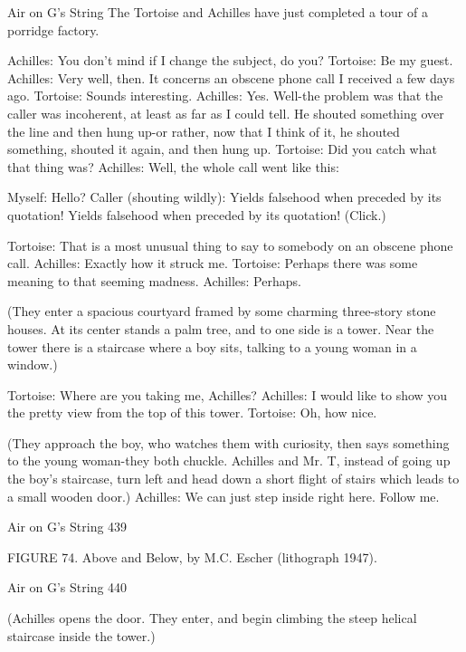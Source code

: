 
                                  Air on G's String
       The Tortoise and Achilles have just completed a tour of a porridge factory.

Achilles: You don't mind if I change the subject, do you? Tortoise: Be my guest.
Achilles: Very well, then. It concerns an obscene phone call I received a few days ago.
Tortoise: Sounds interesting.
Achilles: Yes. Well-the problem was that the caller was incoherent, at least as far as I
  could tell. He shouted something over the line and then hung up-or rather, now that I
  think of it, he shouted something, shouted it again, and then hung up.
Tortoise: Did you catch what that thing was?
Achilles: Well, the whole call went like this:

       Myself: Hello?
       Caller (shouting wildly): Yields falsehood when preceded by its quotation! Yields
              falsehood when preceded by its quotation!
       (Click.)

Tortoise: That is a most unusual thing to say to somebody on an obscene phone call.
Achilles: Exactly how it struck me.
Tortoise: Perhaps there was some meaning to that seeming madness.
Achilles: Perhaps.

   (They enter a spacious courtyard framed by some charming three-story stone
     houses. At its center stands a palm tree, and to one side is a tower. Near the
     tower there is a staircase where a boy sits, talking to a young woman in a
     window.)

Tortoise: Where are you taking me, Achilles?
Achilles: I would like to show you the pretty view from the top of this tower.
Tortoise: Oh, how nice.

  (They approach the boy, who watches them with curiosity, then says something to
    the young woman-they both chuckle. Achilles and Mr. T, instead of going up the
    boy's staircase, turn left and head down a short flight of stairs which leads to a
    small wooden door.)
  Achilles: We can just step inside right here. Follow me.




Air on G's String                                                                     439

FIGURE 74. Above and Below, by M.C. Escher (lithograph 1947).




Air on G's String                                               440

   (Achilles opens the door. They enter, and begin climbing the steep helical staircase
      inside the tower.)

